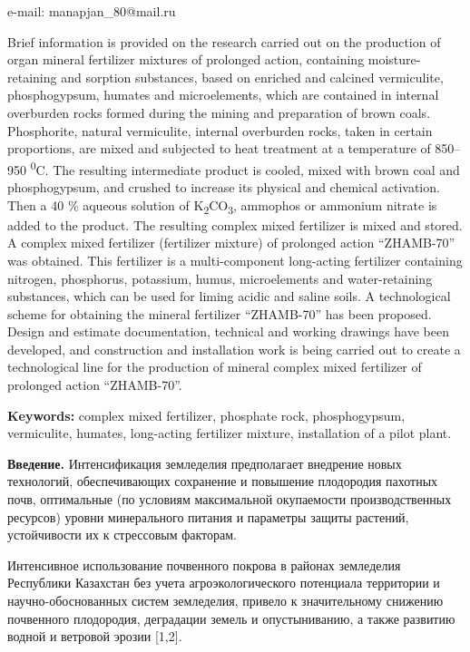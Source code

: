 e-mail: manapjan\_80@mail.ru

Brief information is provided on the research carried out on the
production of organ mineral fertilizer mixtures of prolonged action,
containing moisture-retaining and sorption substances, based on enriched
and calcined vermiculite, phosphogypsum, humates and microelements,
which are contained in internal overburden rocks formed during the
mining and preparation of brown coals. Phosphorite, natural vermiculite,
internal overburden rocks, taken in certain proportions, are mixed and
subjected to heat treatment at a temperature of 850--950
\textsuperscript{0}C. The resulting intermediate product is cooled,
mixed with brown coal and phosphogypsum, and crushed to increase its
physical and chemical activation. Then a 40 \% aqueous solution of
K\textsubscript{2}CO\textsubscript{3}, ammophos or ammonium nitrate is
added to the product. The resulting complex mixed fertilizer is mixed
and stored. A complex mixed fertilizer (fertilizer mixture) of prolonged
action ``ZHAMB-70'' was obtained. This fertilizer is a multi-component
long-acting fertilizer containing nitrogen, phosphorus, potassium,
humus, microelements and water-retaining substances, which can be used
for liming acidic and saline soils. A technological scheme for obtaining
the mineral fertilizer ``ZHAMB-70'' has been proposed. Design and
estimate documentation, technical and working drawings have been
developed, and construction and installation work is being carried out
to create a technological line for the production of mineral complex
mixed fertilizer of prolonged action ``ZHAMB-70''.

\textbf{Keywords:} complex mixed fertilizer, phosphate rock,
phosphogypsum, vermiculite, humates, long-acting fertilizer mixture,
installation of a pilot plant.

\textbf{Введение.} Интенсификация земледелия предполагает внедрение
новых технологий, обеспечивающих сохранение и повышение плодородия
пахотных почв, оптимальные (по условиям максимальной окупаемости
производственных ресурсов) уровни минерального питания и параметры
защиты растений, устойчивости их к стрессовым факторам.

Интенсивное использование почвенного покрова в районах земледелия
Республики Казахстан без учета агроэкологического потенциала территории
и научно-обоснованных систем земледелия, привело к значительному
снижению почвенного плодородия, деградации земель и опустыниванию, а
также развитию водной и ветровой эрозии {[}1,2{]}.

